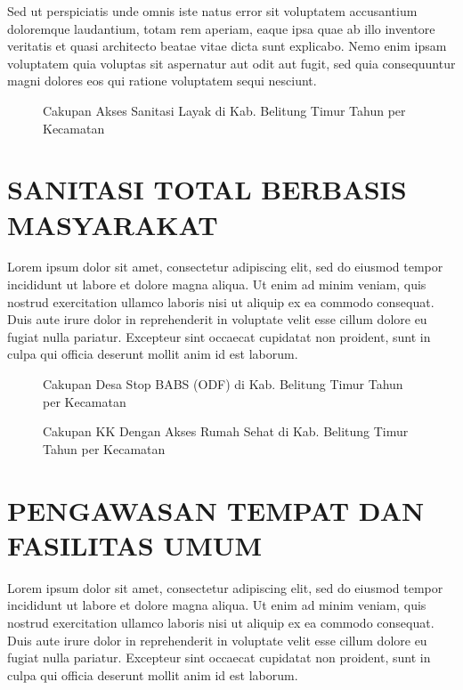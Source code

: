 Sed ut perspiciatis unde omnis iste natus error sit voluptatem accusantium doloremque laudantium, totam rem aperiam, eaque ipsa quae ab illo inventore veritatis et quasi architecto beatae vitae dicta sunt explicabo. Nemo enim ipsam voluptatem quia voluptas sit aspernatur aut odit aut fugit, sed quia consequuntur magni dolores eos qui ratione voluptatem sequi nesciunt.

\begin{figure}[H]
	\centering
	\caption{Cakupan Akses Sanitasi Layak di Kab. Belitung Timur Tahun \tP per Kecamatan}
	\label{fig:Cakupan-Akses-Sanitasi}
\end{figure}

\section{SANITASI TOTAL BERBASIS MASYARAKAT}
Lorem ipsum dolor sit amet, consectetur adipiscing elit, sed do eiusmod tempor incididunt ut labore et dolore magna aliqua. Ut enim ad minim veniam, quis nostrud exercitation ullamco laboris nisi ut aliquip ex ea commodo consequat. Duis aute irure dolor in reprehenderit in voluptate velit esse cillum dolore eu fugiat nulla pariatur. Excepteur sint occaecat cupidatat non proident, sunt in culpa qui officia deserunt mollit anim id est laborum.

\begin{figure}[H]
	\centering
	\caption{Cakupan Desa Stop BABS (ODF) di Kab. Belitung Timur Tahun \tP per Kecamatan}
	\label{fig:Cakupan-Desa-SBS}
\end{figure}

\begin{figure}[H]
	\centering
	\caption{Cakupan KK Dengan Akses Rumah Sehat di Kab. Belitung Timur Tahun \tP per Kecamatan}
	\label{fig:Cakupan-KK-Rumah-Sehat}
\end{figure}

\section{PENGAWASAN TEMPAT DAN FASILITAS UMUM}
Lorem ipsum dolor sit amet, consectetur adipiscing elit, sed do eiusmod tempor incididunt ut labore et dolore magna aliqua. Ut enim ad minim veniam, quis nostrud exercitation ullamco laboris nisi ut aliquip ex ea commodo consequat. Duis aute irure dolor in reprehenderit in voluptate velit esse cillum dolore eu fugiat nulla pariatur. Excepteur sint occaecat cupidatat non proident, sunt in culpa qui officia deserunt mollit anim id est laborum.

